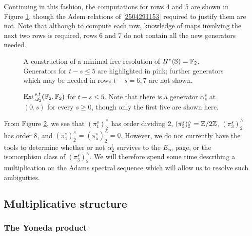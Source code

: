 \documentclass{MetricNotes2023}
\def\bb{\ensuremath\mathbb}
\def\inte{\ensuremath\mathbb{Z}}
\def\A{\ensuremath{\mathscr{A}_2}}
\DeclareMathOperator{\Ext}{Ext}
\begin{document}
Continuing in this fashion, the computations for rows 4 and 5 are shown in Figure \ref{2504201106}, though the Adem relations of \ref{2504291153} required to justify them are not. Note that although to compute each row, knowledge of maps involving the next two rows is required, rows 6 and 7 do not contain all the new generators needed. 

\begin{figure}
\centering

\caption{A construction of a minimal free resolution of \(H^*(\bb{S})=\bb{F}_2\). Generators for \(t-s\leq 5\) are highlighted in pink; further generators which may be needed in rows \(t-s=6, 7\) are not shown.}\label{2504201106}
\end{figure}

\begin{figure}
\centering

\caption{\(\Ext^{s,t}_{\A}(\bb{F}_2, \bb{F}_2)\) for \(t-s\leq 5\). Note that there is a generator \(\alpha^s_s\) at \((0,s)\) for every \(s\geq 0\), though only the first five are shown here.}
\label{2504241018}
\end{figure}

From Figure \ref{2504241018}, we see that \((\pi_1^s)^\wedge_2\) has order dividing 2, \((\pi_2^s)^\wedge_2=\inte/2\inte\), \((\pi_3^s)^\wedge_2\) has order 8, and \((\pi_4^s)^\wedge_2=(\pi_5^s)^\wedge_2=0\). However, we do not currently have the tools to determine whether or not \(\alpha^1_2\) survives to the \(E_\infty\) page, or the isomorphism class of \((\pi_3^s)^\wedge_2\). We will therefore spend some time describing a multiplication on the Adams spectral sequence which will allow us to resolve such ambiguities.

\subsection{Multiplicative structure}\label{2504291250}

\subsubsection{The Yoneda product}\label{2504171922}
\end{document}
